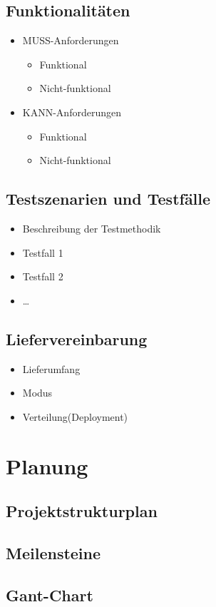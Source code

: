 \subsection{Funktionalitäten}
\begin{itemize}
	\item MUSS-Anforderungen
	\begin{itemize}
		\item Funktional
		\item Nicht-funktional
	\end{itemize}
	\item KANN-Anforderungen
	\begin{itemize}
		\item Funktional
		\item Nicht-funktional
	\end{itemize}
\end{itemize}
\subsection{Testszenarien und Testfälle}
\begin{itemize}
	\item Beschreibung der Testmethodik
	\item Testfall 1
	\item Testfall 2
	\item \ldots
\end{itemize}
\subsection{Liefervereinbarung}
\begin{itemize}
	\item Lieferumfang
	\item Modus
	\item Verteilung(Deployment)
\end{itemize}
\section{Planung}
\subsection{Projektstrukturplan}
\subsection{Meilensteine}
\subsection{Gant-Chart}
